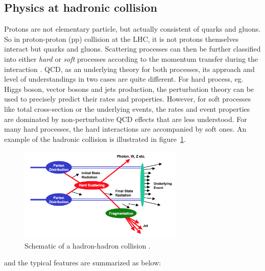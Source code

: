 \subsection{Physics at hadronic collision}
\label{hadroniccollision}

Protons are not elementary particle, but actually consistent of quarks and gluons.
So in proton-proton (pp) collision at the LHC, it is not protons themselves interact but quarks and gluons.
Scattering processes can then be further classified into either \textit{hard} or \textit{soft} processes
according to the momentum transfer during the interaction \cite{Dremin:2005wd}.
QCD, as an underlying theory for both processes, its approach and level of understandings in two cases are quite different.
For hard process, eg. Higgs boson, vector bosons and jets production, 
the perturbation theory can be used to precisely predict their rates and properties.
However, for soft processes like total cross-section or the underlying events, the rates and event properties are dominated by non-perturbative QCD effects that are less understood.
For many hard processes, the hard interactions are accompanied by soft ones.
An example of the hadronic collision is illustrated in figure~\ref{fig:C2_had_col}. 
\begin{figure}[!htb]
  \centering
  \includegraphics[width=0.7\textwidth]{figures/Theory/hh_collision.png}
  \caption{Schematic of a hadron-hadron collision \cite{Womersley:2000cx}.}
  \label{fig:C2_had_col}
\end{figure}
and the typical features are summarized as below:
